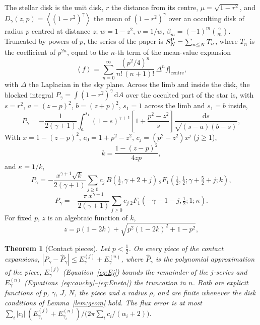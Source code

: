 \documentclass[11pt]{article}
\newtheorem{theorem}{Theorem}
\newcommand{\avg}[1]{\left\langle #1 \right\rangle}
\newcommand{\dd}{\mathrm{d}}
\begin{document}
The stellar disk is the unit disk, $r$ the distance from its centre, $\mu=\sqrt{1-r^2}$, and
$D_\gamma(z,p)=\avg{(1-r^2)^\gamma}$ the mean of $(1-r^2)^\gamma$ over an occulting disk of radius $p$ centred at
distance $z$; $w=1-z^2$, $v=1/w$, $\beta_m=(-1)^m\binom{\gamma}{m}$. Truncated by powers of $p$, the series of
the paper is $S^{\rm P}_N=\sum_{n\le N}T_n$, where $T_n$ is the coefficient of $p^{2n}$, equal to the $n$-th term of
the mean-value expansion
\begin{equation}
\avg{f}=\sum_{n=0}^\infty\frac{(p^2/4)^n}{n!\,(n+1)!}\,\Delta^n f\big|_{\mathrm{centre}}, \label{eq:pizzetti}
\end{equation}
with $\Delta$ the Laplacian in the sky plane. Across the limb and inside the disk, the blocked integral
$P_\gamma=\int(1-r^2)^\gamma\,\dd A$ over the occulted part of the star is, with $s=r^2$, $a=(z-p)^2$,
$b=(z+p)^2$, $s_1=1$ across the limb and $s_1=b$ inside,
\begin{equation}
P_\gamma=-\frac{1}{2(\gamma+1)}\int_a^{s_1}(1-s)^{\gamma+1}\left[1+\frac{p^2-z^2}{s}\right]\frac{\dd s}{\sqrt{(s-a)(b-s)}}, \label{eq:P1d}
\end{equation}
With $x=1-(z-p)^2$, $c_0=1+p^2-z^2$, $c_j=(p^2-z^2)x^j$ ($j\ge1$),
\begin{equation}
k=\frac{1-(z-p)^2}{4zp}, \label{eq:k}
\end{equation}
and $\kappa=1/k$,
\begin{equation}
P_\gamma=-\frac{x^{\gamma+1}\sqrt{k}}{2(\gamma+1)}\sum_{j\ge0}c_j\,B\!\left(\tfrac12,\gamma+2+j\right)\,{}_2F_1\!\left(\tfrac12,\tfrac12;\gamma+\tfrac52+j;k\right), \label{eq:ingress}
\end{equation}
\begin{equation}
P_\gamma=-\frac{\pi\,x^{\gamma+1}}{2(\gamma+1)}\sum_{j\ge0}c_j\,{}_2F_1\!\left(-\gamma-1-j,\tfrac12;1;\kappa\right). \label{eq:interiorhyp}
\end{equation}
For fixed $p$, $z$ is an algebraic function of $k$,
\begin{equation}
z=p(1-2k)+\sqrt{p^2(1-2k)^2+1-p^2}, \label{eq:zk}
\end{equation}
\begin{theorem}[Contact pieces] \label{thm:contact}
Let $p<\tfrac12$. On every piece of the contact expansions, $|P_\gamma-\hat P_\gamma|\le E_\gamma^{(j)}+E_\gamma^{(n)}$, where $\hat P_\gamma$ is the polynomial approximation of the piece, $E_\gamma^{(j)}$ (Equation~\ref{eq:Ej}) bounds the remainder of the $j$-series and $E_\gamma^{(n)}$ (Equations~\ref{eq:cauchy}--\ref{eq:Eneta}) the truncation in $n$. Both are explicit functions of $p$, $\gamma$, $J$, $N$, the piece and a radius $\rho$, and are finite whenever the disk conditions of Lemma~\ref{lem:geom} hold. The flux error is at most $\sum_i|c_i|\,(E^{(j)}_{\gamma_i}+E^{(n)}_{\gamma_i})\big/\bigl(2\pi\sum_ic_i/(\alpha_i+2)\bigr)$.
\end{theorem}
\end{document}
